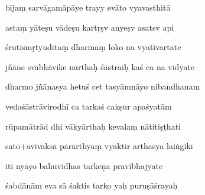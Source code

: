 \documentclass[article,12pt,a4paper]{memoir}%
\newcounter{parCount}
\begin{document}
	  
	  \pstart \leavevmode%
	bījaṃ sarvāgamāpāye trayy evāto vyavasthitā 
	{}
	\pend%
      

	  
	  \pstart {} astaṃ yāteṣu vādeṣu kartṛṣv anyeṣv asatsv api 
	{}
	\pend%
      

	  
	  \pstart \leavevmode%
	śrutismṛtyuditaṃ dharmaṃ loko na vyativartate 
	{}
	\pend%
      

	  
	  \pstart {} jñāne svābhāvike nārthaḥ śāstraiḥ kaś ca na vidyate 
	{}
	\pend%
      

	  
	  \pstart \leavevmode%
	dharmo jñānasya hetuś cet tasyāmnāyo nibandhanam 
	{}
	\pend%
      

	  
	  \pstart {} vedaśāstrāvirodhī ca tarkaś cakṣur apaśyatām 
	{}
	\pend%
      

	  
	  \pstart \leavevmode%
	rūpamātrād dhi vākyārthaḥ kevalaṃ nātitiṣṭhati 
	{}
	\pend%
      

	  
	  \pstart {} sato+avivakṣā pārārthyaṃ vyaktir arthasya laiṅgikī 
	{}
	\pend%
      

	  
	  \pstart \leavevmode%
	iti nyāyo bahuvidhas tarkeṇa pravibhajyate 
	{}
	\pend%
      

	  
	  \pstart {} śabdānām eva sā śaktis tarko yaḥ puruṣāśrayaḥ 
	{}
	\pend%
      
\end{document}
